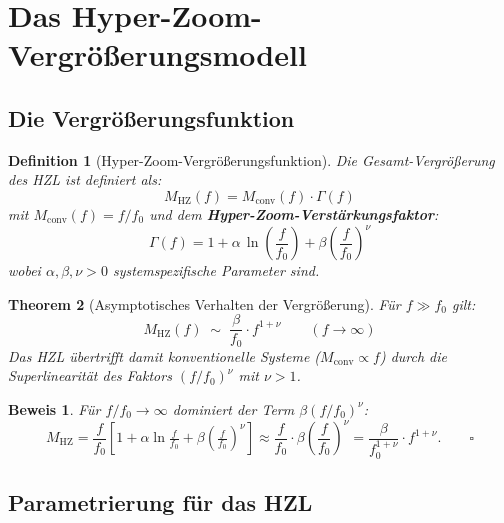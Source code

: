 ﻿\documentclass[12pt,a4paper]{article}
\newtheorem{theorem}{Theorem}[section]
\newtheorem{definition}[theorem]{Definition}
\newtheorem{beweis}{Beweis}
\theoremstyle{definition}
\newcommand{\HZ}{\mathrm{HZ}}
\newcommand{\conv}{\mathrm{conv}}
\begin{document}
	\section{Das Hyper-Zoom-Vergrößerungsmodell}
	
	\subsection{Die Vergrößerungsfunktion}
	
	\begin{definition}[Hyper-Zoom-Vergrößerungsfunktion]
		Die Gesamt-Vergrößerung des HZL ist definiert als:
		\begin{equation}
			\boxed{
				M_\HZ(f) = M_\conv(f)\cdot\Gamma(f)
			}
			\label{eq:mhz}
		\end{equation}
		mit $M_\conv(f) = f/f_0$ und dem \textbf{Hyper-Zoom-Verstärkungsfaktor}:
		\begin{equation}
			\Gamma(f) = 1 + \alpha\,\ln\!\left(\frac{f}{f_0}\right)
			+ \beta\!\left(\frac{f}{f_0}\right)^{\!\nu}
			\label{eq:gamma}
		\end{equation}
		wobei $\alpha, \beta, \nu > 0$ systemspezifische Parameter sind.
	\end{definition}
	
	\begin{theorem}[Asymptotisches Verhalten der Vergrößerung]
		Für $f \gg f_0$ gilt:
		\begin{equation}
			M_\HZ(f) \;\sim\; \frac{\beta}{f_0}\cdot f^{1+\nu}
			\qquad (f \to \infty)
		\end{equation}
		Das HZL übertrifft damit konventionelle Systeme ($M_\conv \propto f$) durch die
		Superlinearität des Faktors $(f/f_0)^\nu$ mit $\nu > 1$.
	\end{theorem}
	
	\begin{beweis}
		Für $f/f_0 \to \infty$ dominiert der Term $\beta(f/f_0)^\nu$:
		\[
		M_\HZ = \frac{f}{f_0}\!\left[1 + \alpha\ln\!\tfrac{f}{f_0}
		+ \beta\!\left(\tfrac{f}{f_0}\right)^{\!\nu}\right]
		\approx \frac{f}{f_0}\cdot\beta\!\left(\frac{f}{f_0}\right)^{\!\nu}
		= \frac{\beta}{f_0^{1+\nu}}\cdot f^{1+\nu}. \qquad\square
		\]
	\end{beweis}
	
	\subsection{Parametrierung für das HZL}
	
\end{document}
